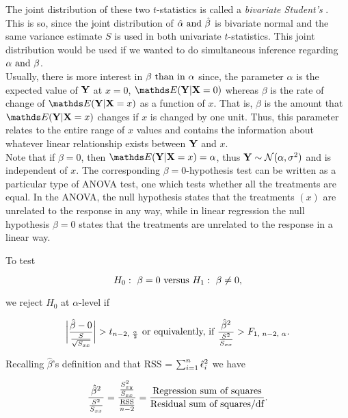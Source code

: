 \documentclass{homework}
\begin{document}
The joint distribution of these two $t$-statistics is called a \textit{bivariate Student's \tdis}. This is so, since the joint distribution of $\hat \alpha \textnormal{ and } \hat \beta$ is bivariate normal and the same variance estimate $S$ is used in both univariate $t$-statistics. This joint distribution would be used if we wanted to do simultaneous inference regarding $\alpha \textnormal{ and } \beta$. \\

Usually, there is more interest in $\beta \textnormal{ than in } \alpha$ since, the parameter $\alpha$ is the expected value of ${\bf Y}$ at $x = 0$, $\E(\Y | \X = 0)$ whereas $\beta$ is the rate of change of $\E(\Y | \X = x)$ as a function of $x$. That is, $\beta$ is the amount that $\E(\Y | \X = x)$ changes if $x$ is changed by one unit. Thus, this parameter relates to the entire range of $x$ values and contains the information about whatever linear relationship exists between ${\bf Y}$ and $x$. \\

Note that if $\beta = 0$, then $\E(\Y | \X = x) = \alpha$, thus ${\bf Y} \sim \mathcal{N}(\alpha, \sigma^2)$ and is independent of $x$. The corresponding $\beta = 0$-hypothesis test can be written as a particular type of ANOVA test, one which tests whether all the treatments are equal. In the ANOVA, the null hypothesis states that the treatments $(x)$ are unrelated to the response in any way, while in linear regression the null hypothesis $\beta = 0$ states that the treatments are unrelated to the response in a linear way. 

To test 

$$
H_0 : \textnormal{ } \beta = 0 \textnormal{ versus } H_1 : \textnormal{ } \beta \neq 0,
$$

we reject $H_0$ at $\alpha$-level if 

\begin{align*}
\bigg|\frac{\hat{\beta} - 0}{\frac{S}{\sqrt{S_{xx}}}}\bigg| > t_{n-2, \textnormal{ } \frac{\alpha}{2}} \textnormal{ or equivalently, if } \frac{\hat{\beta}^2}{\frac{S^2}{S_{xx}}} > F_{1, \textnormal{ } n-2, \textnormal{ } \alpha}.
\end{align*}

Recalling $\hat{\beta}$'s definition and that RSS = $\sum_{i=1}^{n} \hat{\epsilon}_i^2$ we have

$$
\frac{\hat{\beta}^2}{\frac{S^2}{S_{xx}}} = \frac{\frac{S_{xy}^2}{S_{xx}}}{\frac{\textnormal{RSS}}{n-2}} = \frac{\textnormal{Regression sum of squares}}{\textnormal{Residual sum of squares/df}}.
$$
\end{document}
